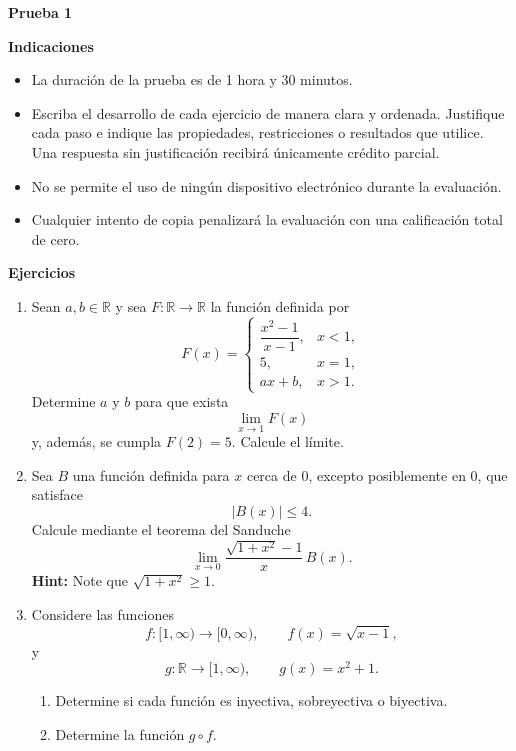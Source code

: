 \documentclass[10pt,a5paper]{article}
\begin{document}
\begin{center}
  {\color{Azul}\large\bfseries Prueba 1}
\end{center}

\medskip

\medskip
\noindent\textbf{Indicaciones}
\begin{itemize}
  \item La duración de la prueba es de 1 hora y 30 minutos.
  \item Escriba el desarrollo de cada ejercicio de manera clara y ordenada.
  Justifique cada paso e indique las propiedades, restricciones o resultados que
  utilice. Una respuesta sin justificación recibirá únicamente crédito parcial.
  \item No se permite el uso de ningún dispositivo electrónico durante la
  evaluación.
  \item Cualquier intento de copia penalizará la evaluación con una calificación
  total de cero.
\end{itemize}

\medskip
\noindent\textbf{Ejercicios}
\begin{enumerate}
  \item Sean $a,b\in\mathbb{R}$ y sea $F\colon\mathbb{R}\to\mathbb{R}$ la función definida por
  \[
    F(x)=
    \begin{cases}
      \dfrac{x^2-1}{x-1}, & x<1,\\[2mm]
      5, & x=1,\\
      ax+b, & x>1.
    \end{cases}
  \]
  Determine $a$ y $b$ para que exista
  \[
    \lim_{x\to1}F(x)
  \]
  y, además, se cumpla $F(2)=5$. Calcule el límite.

  \item Sea $B$ una función definida para $x$ cerca de $0$, excepto posiblemente en $0$, que satisface
  \[
    |B(x)|\leq4.
  \]
  Calcule mediante el teorema del Sanduche
  \[
    \lim_{x\to0}
    \frac{\sqrt{1+x^2}-1}{x}\,B(x).
  \]
  \textbf{Hint:} Note que $\sqrt{1+x^2}\geq 1$.
  \item Considere las funciones
  \[
    f\colon[1,\infty)\to[0,\infty),
    \qquad
    f(x)=\sqrt{x-1},
  \]
  y
  \[
    g\colon\mathbb{R}\to[1,\infty),
    \qquad
    g(x)=x^2+1.
  \]
  \begin{enumerate}
    \item Determine si cada función es inyectiva, sobreyectiva o biyectiva.
    \item Determine la función $g\circ f$.
  \end{enumerate}
\end{enumerate}
\end{document}
